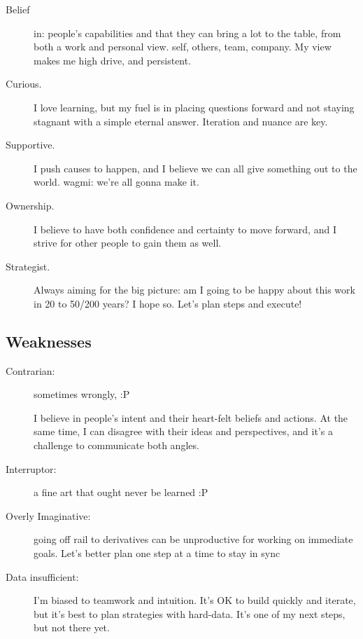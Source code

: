 \documentclass[10pt, a4paper, twocolumn]{article}
\begin{document}
\begin{description}
 \item[Belief] in: people's capabilities and that they can bring a lot to the table, from both a work and personal view.
 self, others, team, company.
 My view %
 makes me %
 high drive, and persistent.
\item[Curious.] I love learning, but my fuel is in placing questions forward and not staying stagnant with a simple eternal answer. Iteration and nuance are key.
\item[Supportive.] I push causes to happen, and I believe we can all give something out to the world. wagmi: we're all gonna make it.
\item[Ownership.] I believe to have both confidence and certainty to move forward, and I strive for other people to gain them as well.
\item[Strategist.] Always aiming for the big picture: am I going to be happy about this work in 20 to 50/200 years? I hope so. Let's plan steps and execute!
 \end{description}

\subsection*{Weaknesses}

\begin{description}
 \item[Contrarian:] sometimes wrongly, :P
 \item[] \> \> \>
 I believe in people's intent and their heart-felt beliefs and actions. At the same time,
 I can disagree with their ideas and perspectives,
 and it's a challenge to communicate both angles.
 \item[Interruptor:] a fine art that ought
 never be learned :P
 \item[Overly Imaginative:] going off rail to derivatives can be unproductive for working on immediate goals. Let's better plan one step at a time %
 to stay in sync
 \item[Data insufficient:] I'm biased to teamwork and intuition. It's OK to build quickly and iterate, but %
 it's best to plan strategies with hard-data. %
 It's one of my next steps, but not there yet.
 \end{description}
\end{document}
